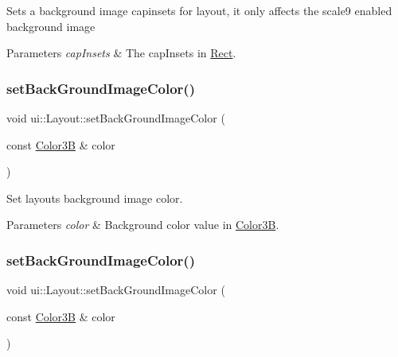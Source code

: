 Sets a background image capinsets for layout, it only affects the scale9 enabled background image


\begin{DoxyParams}{Parameters}
{\em cap\+Insets} & The cap\+Insets in \hyperlink{classRect}{Rect}. \\
\hline
\end{DoxyParams}
\mbox{\label{classui_1_1Layout_acad2194099548020e1fe05c4c358c2fb}} 
\subsubsection{\texorpdfstring{set\+Back\+Ground\+Image\+Color()}{setBackGroundImageColor()}\hspace{0.1cm}{\footnotesize\ttfamily [1/2]}}
{\footnotesize\ttfamily void ui\+::\+Layout\+::set\+Back\+Ground\+Image\+Color (\begin{DoxyParamCaption}\item[{const \hyperlink{structColor3B}{Color3B} \&}]{color }\end{DoxyParamCaption})}

Set layout\textquotesingle{}s background image color. 
\begin{DoxyParams}{Parameters}
{\em color} & Background color value in {\ttfamily \hyperlink{structColor3B}{Color3B}}. \\
\hline
\end{DoxyParams}
\mbox{\label{classui_1_1Layout_acad2194099548020e1fe05c4c358c2fb}} 
\subsubsection{\texorpdfstring{set\+Back\+Ground\+Image\+Color()}{setBackGroundImageColor()}\hspace{0.1cm}{\footnotesize\ttfamily [2/2]}}
{\footnotesize\ttfamily void ui\+::\+Layout\+::set\+Back\+Ground\+Image\+Color (\begin{DoxyParamCaption}\item[{const \hyperlink{structColor3B}{Color3B} \&}]{color }\end{DoxyParamCaption})}

